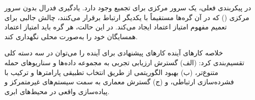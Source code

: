 در پیکربندی فعلی، یک سرور مرکزی برای تجمیع وجود دارد. یادگیری فدرال بدون سرور مرکزی () که در آن گره‌ها مستقیماً با یکدیگر ارتباط برقرار می‌کنند، چالش جالبی برای تعمیم مفهوم امتیاز اعتماد ایجاد می‌کند. در این حالت، هر گره باید امتیاز اعتماد همسایگان خود را به‌صورت محلی نگهداری کند.

\begin{goal}{خلاصه کارهای آینده}
    کارهای پیشنهادی برای آینده را می‌توان در سه دسته کلی تقسیم‌بندی کرد: (الف) گسترش ارزیابی تجربی به مجموعه داده‌ها و سناریوهای حمله متنوع‌تر، (ب) بهبود الگوریتمی از طریق انتخاب تطبیقی پارامترها و ترکیب با فشرده‌سازی ارتباطی، و (ج) گسترش معماری به سمت سیستم‌های غیرمتمرکز و پیاده‌سازی واقعی در محیط‌های ابری.
\end{goal}
